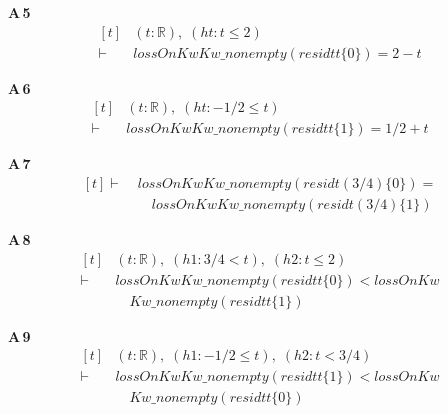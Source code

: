 \noindent\textbf{A\,5}\quad{}
{\footnotesize\[ \begin{aligned}[t]
&(\mathit{t} : \mathbb{R} ),\; (\mathit{ht} : \mathit{t} \leq 2)\\
\vdash\;&\mathit{lossOn} \mathit{Kw} \mathit{Kw\_nonempty} (\mathit{residt} \mathit{t} \{ 0\} ) = 2 - \mathit{t}
\end{aligned} \]}

\noindent\textbf{A\,6}\quad{}
{\footnotesize\[ \begin{aligned}[t]
&(\mathit{t} : \mathbb{R} ),\; (\mathit{ht} : -1 / 2 \leq \mathit{t})\\
\vdash\;&\mathit{lossOn} \mathit{Kw} \mathit{Kw\_nonempty} (\mathit{residt} \mathit{t} \{ 1\} ) = 1 / 2 + \mathit{t}
\end{aligned} \]}

\noindent\textbf{A\,7}\quad{}
{\footnotesize\[ \begin{aligned}[t]
\vdash\;&\mathit{lossOn} \mathit{Kw} \mathit{Kw\_nonempty} (\mathit{residt} (3 / 4) \{ 0\} ) =\\
&\quad \mathit{lossOn} \mathit{Kw} \mathit{Kw\_nonempty} (\mathit{residt} (3 / 4) \{ 1\} )
\end{aligned} \]}

\noindent\textbf{A\,8}\quad{}
{\footnotesize\[ \begin{aligned}[t]
&(\mathit{t} : \mathbb{R} ),\; (\mathit{h1} : 3 / 4 < \mathit{t}),\; (\mathit{h2} : \mathit{t} \leq 2)\\
\vdash\;&\mathit{lossOn} \mathit{Kw} \mathit{Kw\_nonempty} (\mathit{residt} \mathit{t} \{ 0\} ) < \mathit{lossOn} \mathit{Kw}\\
&\quad \mathit{Kw\_nonempty} (\mathit{residt} \mathit{t} \{ 1\} )
\end{aligned} \]}

\noindent\textbf{A\,9}\quad{}
{\footnotesize\[ \begin{aligned}[t]
&(\mathit{t} : \mathbb{R} ),\; (\mathit{h1} : -1 / 2 \leq \mathit{t}),\; (\mathit{h2} : \mathit{t} < 3 / 4)\\
\vdash\;&\mathit{lossOn} \mathit{Kw} \mathit{Kw\_nonempty} (\mathit{residt} \mathit{t} \{ 1\} ) < \mathit{lossOn} \mathit{Kw}\\
&\quad \mathit{Kw\_nonempty} (\mathit{residt} \mathit{t} \{ 0\} )
\end{aligned} \]}

